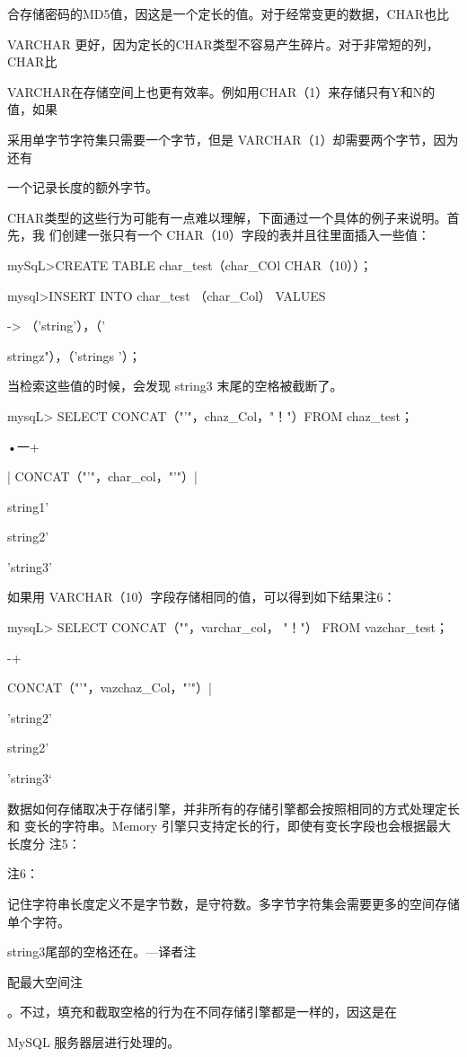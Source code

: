 合存储密码的MD5值，因这是一个定长的值。对于经常变更的数据，CHAR也比

VARCHAR 更好，因为定长的CHAR类型不容易产生碎片。对于非常短的列，CHAR比

VARCHAR在存储空间上也更有效率。例如用CHAR（1）来存储只有Y和N的值，如果

采用单字节字符集只需要一个字节，但是 VARCHAR（1）却需要两个字节，因为还有

一个记录长度的额外字节。

CHAR类型的这些行为可能有一点难以理解，下面通过一个具体的例子来说明。首先，我
们创建一张只有一个 CHAR（10）字段的表并且往里面插入一些值：

mySqL>CREATE TABLE char\_test（char\_COl CHAR（10））；

mysql>INSERT INTO char\_test （char\_Col） VALUES

-> （'string'），（'

stringz"），（'strings '）；

当检索这些值的时候，会发现 string3 末尾的空格被截断了。

mysqL> SELECT CONCAT（"'"，chaz\_Col，"！"）FROM chaz\_test；

•一+

| CONCAT（"'"，char\_col，"'"）|

string1'

string2'

'string3'

如果用 VARCHAR（10）字段存储相同的值，可以得到如下结果注6：

mysqL> SELECT CONCAT（""，varchar\_col， "！"） FROM vazchar\_test；

-+

CONCAT（"'"，vazchaz\_Col，"'"）|

'string2'

string2'

'string3‘

数据如何存储取决于存储引擎，并非所有的存储引擎都会按照相同的方式处理定长和
变长的字符串。Memory 引擎只支持定长的行，即使有变长字段也会根据最大长度分
注5：

注6：

记住字符串长度定义不是字节数，是守符数。多字节字符集会需要更多的空间存储单个字符。

string3尾部的空格还在。—译者注

配最大空间注

。不过，填充和截取空格的行为在不同存储引擎都是一样的，因这是在

MySQL 服务器层进行处理的。

